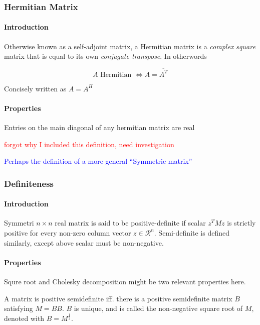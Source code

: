 \subsubsection{Hermitian Matrix}
\paragraph{Introduction} Otherwise known as a self-adjoint matrix,
a Hermitian matrix is a \emph{complex square} matrix that is equal
to its own \emph{conjugate transpose}. In otherwords

\begin{equation*}
    A \text{ Hermitian } \Leftrightarrow A = \overline{{A^T}}
\end{equation*}

Concisely written as $A = A^H$

\paragraph{Properties}

Entries on the main diagonal of any hermitian matrix are real

\textcolor{red}{forgot why I included this definition, need investigation}

\textcolor{blue}{Perhaps the definition of a more general ``Symmetric matrix''}

\subsubsection{Definiteness}

\paragraph{Introduction} Symmetri $n \times n$ real matrix is said to be
positive-definite if scalar $z^TMz$ is strictly positive for every non-zero
column vector $z \in \mathcal{R}^n$. Semi-definite is defined similarly,
except above scalar must be non-negative. 

\paragraph{Properties} Squre root and Cholesky decomposition might be 
two relevant properties here.

A matrix is positive semidefinite iff. there is a positive semidefinite
matrix $B$ satisfying $M = BB$. $B$ is unique, and is called the 
non-negative square root of $M$, denoted with $B = M^{\frac{1}{2}}$.

